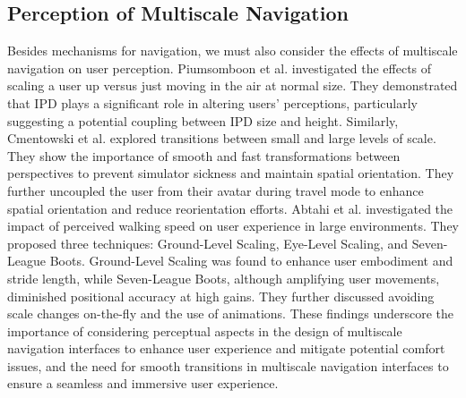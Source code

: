 \subsection{Perception of Multiscale Navigation}
Besides mechanisms for navigation, we must also consider the effects of multiscale navigation on user perception. Piumsomboon et al. \cite{piumsomboon_superman_2018} investigated the effects of scaling a user up versus just moving in the air at normal size. They demonstrated that IPD plays a significant role in altering users' perceptions, particularly suggesting a potential coupling between IPD size and height. Similarly, Cmentowski et al. \cite{cmentowski_outstanding_2019} explored transitions between small and large levels of scale. They show the importance of smooth and fast transformations between perspectives to prevent simulator sickness and maintain spatial orientation. They further uncoupled the user from their avatar during travel mode to enhance spatial orientation and reduce reorientation efforts. Abtahi et al.  \cite{abtahi_im_2019} investigated the impact of perceived walking speed on user experience in large environments. They proposed three techniques: Ground-Level  Scaling, Eye-Level Scaling, and Seven-League Boots. Ground-Level Scaling was found to enhance user embodiment and stride length, while Seven-League Boots, although amplifying user movements, diminished positional accuracy at high gains. They further discussed avoiding scale changes on-the-fly and the use of animations. These findings underscore the importance of considering perceptual aspects in the design of multiscale navigation interfaces to enhance user experience and mitigate potential comfort issues, and the need for smooth transitions in multiscale navigation interfaces to ensure a seamless and immersive user experience.

